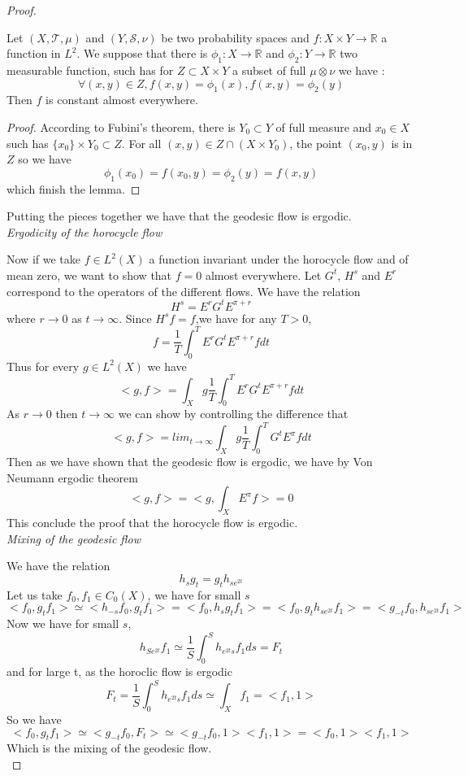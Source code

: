 \begin{proof}
\begin{lem}
Let $(X,\mathcal{T},\mu)$ and $(Y,\mathcal{S},\nu)$ be two probability spaces and $f: X \times Y \to \mathbb{R}$ a function in $L^2$. We suppose that there is $\phi_1:X \to \mathbb{R}$ and $\phi_2:Y \to \mathbb{R}$ two measurable function, such has for $Z \subset X \times Y$ a subset of full $\mu \otimes \nu$ we have :
\[
\forall (x,y) \in Z , f(x,y)=\phi_1 (x) , f(x,y)=\phi_2 (y)
\]
Then $f$ is constant almost everywhere.
\end{lem}

\begin{proof}
According to Fubini's theorem, there is $Y_0 \subset Y$ of full measure and $x_0 \in X$ such has $\{ x_0 \} \times Y_0 \subset Z$. For all $(x,y) \in Z \cap (X \times Y_0)$, the point $(x_0,y)$ is in $Z$ so we have \[
\phi_1(x_0)=f(x_0,y)=\phi_2(y)=f(x,y)
\]
which finish the lemma.
\end{proof}

Putting the pieces together we have that the geodesic flow is ergodic.\\

\emph{Ergodicity of the horocycle flow}

Now if we take $f \in L^2(X)$ a function invariant under the horocycle flow and of mean zero, we want to show that $f=0$ almost everywhere.
Let $G^t$, $H^s$ and $E^r$ correspond to the operators of the different flows. We have the relation \[
H^s=E^r G^t E^{\pi+r}
\]
where $r \to 0$ as $t \to \infty$. Since $H^s f=f$,we have for any $T>0$,\[
f=\frac{1}{T} \int_0^T E^r G^t E^{\pi+r} f dt
\]
Thus for every $g \in L^2(X)$ we have \[
<g,f> = \int_X g \frac{1}{T} \int_0^T E^r G^t E^{\pi+r} f dt
\]
As $r \to 0$ then $t \to \infty$ we can show by controlling the difference that \[
<g,f> = lim_{t \to \infty} \int_X g \frac{1}{T} \int_0^T G^t E^{\pi} f dt
\]
Then as we have shown that the geodesic flow is ergodic, we have by Von Neumann ergodic theorem\[
<g,f> = <g,\int_X E^{\pi} f> =0
\]
This conclude the proof that the horocycle flow is ergodic.\\


\emph{Mixing of the geodesic flow}

We have the relation \[
h_s g_t =g_t h_{s e^{2t}}
\]
Let us take $f_0,f_1 \in C_0(X)$,
we have for small $s$ %
\[
<f_0,g_t f_1 > \simeq <h_{-s} f_0,g_t f_1 >=<f_0 , h_s g_t f_1 >
= <f_0 , g_t h_{s e^{2t}} f_1 > = <g_{-t} f_0 , h_{s e^{2t}}f_1>
\]
Now we have for small $s$, \[
h_{S e^{2t}}f_1 \simeq \frac{1}{S} \int_0^S h_{e^{2t}s} f_1 ds =F_t
\]
and for large t, as the horoclic flow is ergodic \[
F_t = \frac{1}{S} \int_0^S h_{e^{2t}s} f_1 ds \simeq \int_X f_1 = <f_1 , 1 >
\]
So we have \[
<f_0, g_t f_1 > \simeq <g_{-t} f_0, F_t > \simeq <g_{-t} f_0 ,1 ><f_1,1> = <f_0,1><f_1,1>
\]
Which is the mixing of the geodesic flow.\\



\end{proof}
